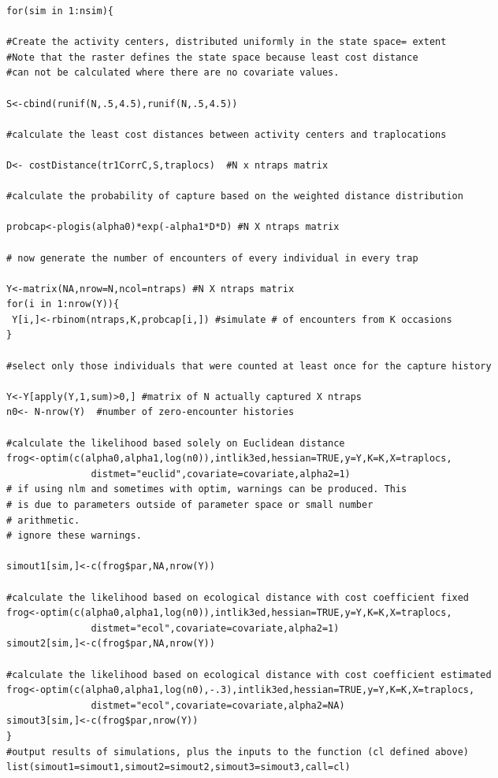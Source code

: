 \documentclass[12pt]{article}
\begin{document}
\begin{spacing}{1.2}
{\begin{verbatim}
for(sim in 1:nsim){

#Create the activity centers, distributed uniformly in the state space= extent
#Note that the raster defines the state space because least cost distance 
#can not be calculated where there are no covariate values.

S<-cbind(runif(N,.5,4.5),runif(N,.5,4.5))

#calculate the least cost distances between activity centers and traplocations 

D<- costDistance(tr1CorrC,S,traplocs)  #N x ntraps matrix

#calculate the probability of capture based on the weighted distance distribution

probcap<-plogis(alpha0)*exp(-alpha1*D*D) #N X ntraps matrix

# now generate the number of encounters of every individual in every trap

Y<-matrix(NA,nrow=N,ncol=ntraps) #N X ntraps matrix
for(i in 1:nrow(Y)){
 Y[i,]<-rbinom(ntraps,K,probcap[i,]) #simulate # of encounters from K occasions
}

#select only those individuals that were counted at least once for the capture history

Y<-Y[apply(Y,1,sum)>0,] #matrix of N actually captured X ntraps
n0<- N-nrow(Y)  #number of zero-encounter histories

#calculate the likelihood based solely on Euclidean distance
frog<-optim(c(alpha0,alpha1,log(n0)),intlik3ed,hessian=TRUE,y=Y,K=K,X=traplocs,
               distmet="euclid",covariate=covariate,alpha2=1)
# if using nlm and sometimes with optim, warnings can be produced. This
# is due to parameters outside of parameter space or small number 
# arithmetic. 
# ignore these warnings.

simout1[sim,]<-c(frog$par,NA,nrow(Y))

#calculate the likelihood based on ecological distance with cost coefficient fixed
frog<-optim(c(alpha0,alpha1,log(n0)),intlik3ed,hessian=TRUE,y=Y,K=K,X=traplocs,
               distmet="ecol",covariate=covariate,alpha2=1)
simout2[sim,]<-c(frog$par,NA,nrow(Y))

#calculate the likelihood based on ecological distance with cost coefficient estimated
frog<-optim(c(alpha0,alpha1,log(n0),-.3),intlik3ed,hessian=TRUE,y=Y,K=K,X=traplocs,
               distmet="ecol",covariate=covariate,alpha2=NA)
simout3[sim,]<-c(frog$par,nrow(Y))
}
#output results of simulations, plus the inputs to the function (cl defined above) 
list(simout1=simout1,simout2=simout2,simout3=simout3,call=cl)


\end{verbatim}}
\end{spacing}
\end{document}
